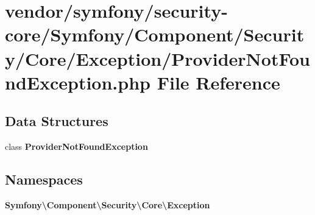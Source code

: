 \section{vendor/symfony/security-\/core/\+Symfony/\+Component/\+Security/\+Core/\+Exception/\+Provider\+Not\+Found\+Exception.php File Reference}
\label{_provider_not_found_exception_8php}
\subsection*{Data Structures}
\begin{DoxyCompactItemize}
\item 
class {\bf Provider\+Not\+Found\+Exception}
\end{DoxyCompactItemize}
\subsection*{Namespaces}
\begin{DoxyCompactItemize}
\item 
 {\bf Symfony\textbackslash{}\+Component\textbackslash{}\+Security\textbackslash{}\+Core\textbackslash{}\+Exception}
\end{DoxyCompactItemize}
